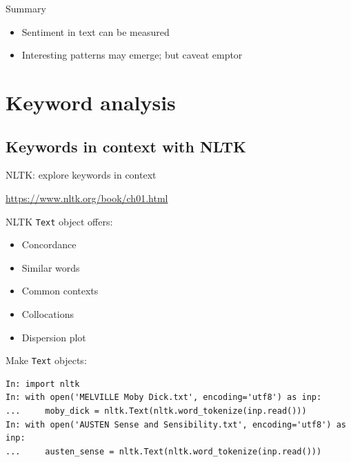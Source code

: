 \documentclass[aspectratio=169,usenames,dvipsnames]{beamer}
\begin{document}
\begin{frame}{Summary}
    \begin{itemize}
        \item Sentiment in text can be measured
        \item Interesting patterns may emerge; but caveat emptor
    \end{itemize}
\end{frame}



\section{Keyword analysis}
\subsection{Keywords in context with NLTK}
\frame{\tableofcontents[currentsection]}

\begin{frame}[fragile]{NLTK: explore keywords in context}
    \begin{reference}
        \url{https://www.nltk.org/book/ch01.html}
    \end{reference}
    NLTK \texttt{Text} object offers:
    \begin{itemize}
        \item Concordance
        \item Similar words
        \item Common contexts
        \item Collocations
        \item Dispersion plot
    \end{itemize}
Make \texttt{Text} objects:
\begin{lstlisting}
In: import nltk
In: with open('MELVILLE Moby Dick.txt', encoding='utf8') as inp:
...     moby_dick = nltk.Text(nltk.word_tokenize(inp.read()))
In: with open('AUSTEN Sense and Sensibility.txt', encoding='utf8') as inp:
...     austen_sense = nltk.Text(nltk.word_tokenize(inp.read()))
\end{lstlisting}
\end{frame}
\end{document}
